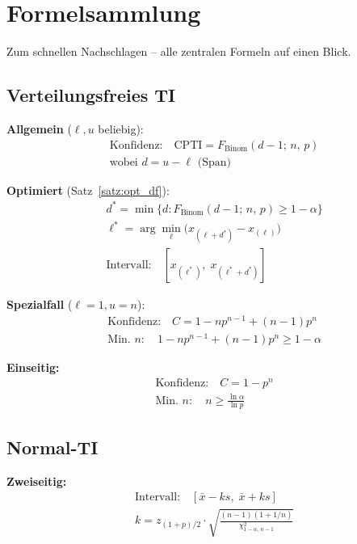 \documentclass[10pt,a4paper,twocolumn]{article}
\theoremstyle{definition}
\newcommand{\xbar}{\bar{x}}
\begin{document}
\newpage

\appendix
\section{Formelsammlung}
\label{app:formeln}

Zum schnellen Nachschlagen -- alle zentralen Formeln auf einen
Blick.

\subsection{Verteilungsfreies TI}

\textbf{Allgemein} ($\ell, u$ beliebig):
\begin{align}
    &\text{Konfidenz:} \quad \mathrm{CPTI} = F_{\mathrm{Binom}}(d-1;\, n,\, p) \\
    &\text{wobei } d = u - \ell \text{ (Span)}
\end{align}

\textbf{Optimiert} (Satz~\ref{satz:opt_df}):
\begin{align}
    &d^* = \min\{d : F_{\mathrm{Binom}}(d-1;\, n,\, p) \geq 1-\alpha\} \\
    &\ell^* = \arg\min_\ell \big(x_{(\ell+d^*)} - x_{(\ell)}\big) \\
    &\text{Intervall:} \quad [x_{(\ell^*)},\; x_{(\ell^*+d^*)}]
\end{align}

\textbf{Spezialfall} ($\ell=1, u=n$):
\begin{align}
    &\text{Konfidenz:} \quad C = 1 - np^{n-1} + (n-1)p^n \\
    &\text{Min.\ } n: \quad 1 - np^{n-1} + (n-1)p^n \geq 1 - \alpha
\end{align}

\textbf{Einseitig:}
\begin{align}
    &\text{Konfidenz:} \quad C = 1 - p^n \\
    &\text{Min.\ } n: \quad n \geq \frac{\ln\alpha}{\ln p}
\end{align}

\subsection{Normal-TI}

\textbf{Zweiseitig:}
\begin{align}
    &\text{Intervall:} \quad [\xbar - ks,\; \xbar + ks] \\
    &k = z_{(1+p)/2} \cdot
    \sqrt{\frac{(n-1)(1+1/n)}{\chi^2_{1-\alpha,\,n-1}}}
\end{align}
\end{document}
